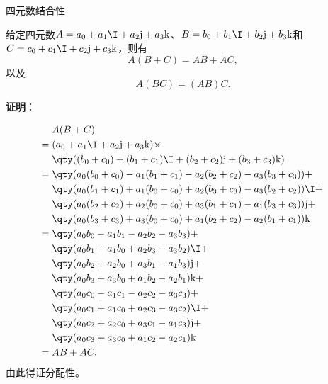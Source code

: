 \begin{theorem}{四元数结合性}

给定四元数$A=a_0+a_1\I+a_2\mathrm{j}+a_3\mathrm{k}$、$B=b_0+b_1\I+b_2\mathrm{j}+b_3\mathrm{k}$和$C=c_0+c_1\I+c_2\mathrm{j}+c_3\mathrm{k}$，则有
\begin{equation}
    A(B+C) = AB+AC, ~
\end{equation}
以及
\begin{equation}
    A(BC) = (AB)C. ~
\end{equation}

\end{theorem}

\textbf{证明}：

\begin{equation}
    \begin{aligned}
        &A(B+C) \\
        ={}& (a_0+a_1\I+a_2\mathrm{j}+a_3\mathrm{k})\times\\
        &\qty((b_0+c_0)+(b_1+c_1)\I+(b_2+c_2)\mathrm{j}+(b_3+c_3)\mathrm{k})\\
        ={}& \qty(a_0(b_0+c_0)-a_1(b_1+c_1)-a_2(b_2+c_2)-a_3(b_3+c_3))+\\
           & \qty(a_0(b_1+c_1)+a_1(b_0+c_0)+a_2(b_3+c_3)-a_3(b_2+c_2))\I+\\
           & \qty(a_0(b_2+c_2)+a_2(b_0+c_0)+a_3(b_1+c_1)-a_1(b_3+c_3))\mathrm{j}+\\
           & \qty(a_0(b_3+c_3)+a_3(b_0+c_0)+a_1(b_2+c_2)-a_2(b_1+c_1))\mathrm{k}\\
        ={}& \qty(a_0b_0-a_1b_1-a_2b_2-a_3b_3)+\\
           & \qty(a_0b_1+a_1b_0+a_2b_3-a_3b_2)\I+\\
           & \qty(a_0b_2+a_2b_0+a_3b_1-a_1b_3)\mathrm{j}+\\
           & \qty(a_0b_3+a_3b_0+a_1b_2-a_2b_1)\mathrm{k}+\\
           & \qty(a_0c_0-a_1c_1-a_2c_2-a_3c_3)+\\
           & \qty(a_0c_1+a_1c_0+a_2c_3-a_3c_2)\I+\\
           & \qty(a_0c_2+a_2c_0+a_3c_1-a_1c_3)\mathrm{j}+\\
           & \qty(a_0c_3+a_3c_0+a_1c_2-a_2c_1)\mathrm{k}\\
        ={}& AB+AC. 
    \end{aligned}~
\end{equation}
由此得证分配性。

